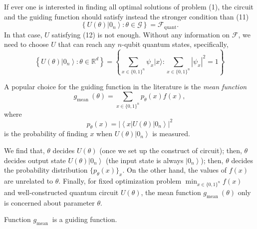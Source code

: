 \begin{remark}
If ever one is interested in finding all optimal solutions of problem (1), the circuit and the guiding function should satisfy instead the stronger condition than (11)
\begin{equation}
    \left\{U(\theta)\left|0_{n}\right\rangle: \theta \in \mathcal{G}\right\}=\mathcal{F}_{\text {quant}}. \tag{13}
\end{equation}
In that case, $U$ satisfying (12) is not enough. Without any information on $\mathcal{F}$, we need to choose $U$ that can reach any $n$-qubit quantum states, specifically, %
\begin{equation}
    \left\{U(\theta)\left|0_{n}\right\rangle: \theta \in \mathbb{R}^{d}\right\}=\left\{\sum_{x \in\{0,1\}^{n}} \psi_{x}|x\rangle: \sum_{x \in\{0,1\}^{n}}\left|\psi_{x}\right|^{2}=1\right\}
\end{equation}
\end{remark}

\begin{definition}
A popular choice for the guiding function in the literature is the \textit{mean function}
\begin{equation}
    g_{\text {mean }}(\theta)=\sum_{x \in\{0,1\}^{n}} p_{\theta}(x) f(x), \tag{14}
\end{equation}
where
\begin{equation}
    p_{\theta}(x)=\left|\left\langle x|U(\theta)| 0_{n}\right\rangle\right|^{2}
\end{equation}
is the probability of finding $x$ when $U(\theta)\left|0_{n}\right\rangle$ is measured.  %
\end{definition}

We find that, $\theta$ decides $U(\theta)$ (once we set up the construct of circuit); then, $\theta$ decides output state $U(\theta)\left|0_{n}\right\rangle$ (the input state is always $\left|0_{n}\right\rangle$); then, $\theta$ decides the probability distribution $\{p_{\theta}(x)\}_{x}$. On the other hand, the values of $f(x)$ are unrelated to $\theta.$ Finally, for fixed optimization problem $\min _{x \in\{0,1\}^{n}} f(x)$ and well-constructed quantum circuit $U(\theta)$, the mean function $g_{\text {mean }}(\theta)$ only is concerned about parameter $\theta.$ 

\begin{proposition}
    Function $g_{\text {mean }}$ is a guiding function.
\end{proposition}

